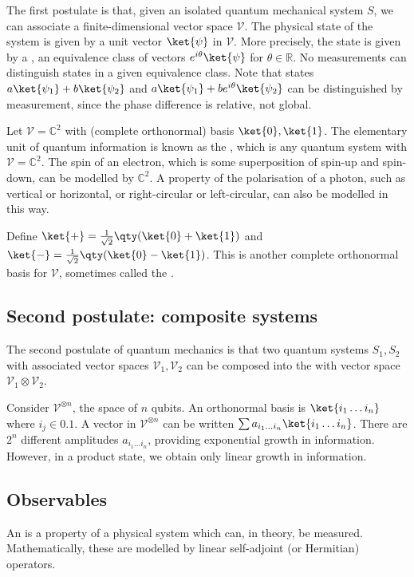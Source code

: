 The first postulate is that, given an isolated quantum mechanical system $S$, we can associate a finite-dimensional vector space $\mathcal V$.
The physical state of the system is given by a unit vector $\ket{\psi}$ in $\mathcal V$.
More precisely, the state is given by a , an equivalence class of vectors $e^{i\theta} \ket{\psi}$ for $\theta \in \mathbb R$.
No measurements can distinguish states in a given equivalence class.
Note that states $a\ket{\psi_1} + b\ket{\psi_2}$ and $a\ket{\psi_1} + be^{i\theta}\ket{\psi_2}$ can be distinguished by measurement, since the phase difference is relative, not global.
\begin{example}
    Let $\mathcal V = \mathbb C^2$ with (complete orthonormal) basis $\ket{0}, \ket{1}$.
    The elementary unit of quantum information is known as the , which is any quantum system with $\mathcal V = \mathbb C^2$.
    The spin of an electron, which is some superposition of spin-up and spin-down, can be modelled by $\mathbb C^2$.
    A property of the polarisation of a photon, such as vertical or horizontal, or right-circular or left-circular, can also be modelled in this way.

    Define $\ket{+} = \frac{1}{\sqrt{2}}\qty(\ket{0} + \ket{1})$ and $\ket{-} = \frac{1}{\sqrt{2}}\qty(\ket{0} - \ket{1})$.
    This is another complete orthonormal basis for $\mathcal V$, sometimes called the .
\end{example}

\subsection{Second postulate: composite systems}
The second postulate of quantum mechanics is that two quantum systems $S_1, S_2$ with associated vector spaces $\mathcal V_1, \mathcal V_2$ can be composed into the  with vector space $\mathcal V_1 \otimes \mathcal V_2$.
\begin{example}
    Consider $\mathcal V^{\otimes n}$, the space of $n$ qubits.
    An orthonormal basis is $\ket{i_1 \dots i_n}$ where $i_j \in \qty{0,1}$.
    A vector in $\mathcal V^{\otimes n}$ can be written $\sum a_{i_1 \dots i_n} \ket{i_1 \dots i_n}$.
    There are $2^n$ different amplitudes $a_{i_1 \dots i_n}$, providing exponential growth in information.
    However, in a product state, we obtain only linear growth in information.
\end{example}

\subsection{Observables}
An  is a property of a physical system which can, in theory, be measured.
Mathematically, these are modelled by linear self-adjoint (or Hermitian) operators.

